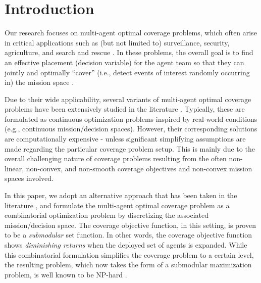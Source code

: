 \documentclass[letterpaper, 10 pt, conference]{ieeeconf}
\begin{document}
\section{Introduction}

Our research focuses on multi-agent optimal coverage problems, which often arise in critical applications such as (but not limited to) surveillance, security, agriculture, and search and rescue \cite{Rezazadeh2019,Cohen2008}. In these problems, the overall goal is to find an effective placement (decision variable) for the agent team so that they can jointly and optimally ``cover'' (i.e., detect events of interest randomly occurring in) the mission space \cite{Zhong2011}. 

Due to their wide applicability, several variants of multi-agent optimal coverage problems have been extensively studied in the literature \cite{Zhong2011,Luo2019,Welikala2019J1,Yu2022}. Typically, these are formulated as continuous optimization problems inspired by real-world conditions (e.g., continuous mission/decision spaces). However, their corresponding solutions are computationally expensive - unless significant simplifying assumptions are made regarding the particular coverage problem setup. This is mainly due to the overall challenging nature of coverage problems resulting from the often non-linear, non-convex, and non-smooth coverage objectives and non-convex mission spaces involved.   

In this paper, we adopt an alternative approach that has been taken in the literature \cite{Sun2019,Sun2020},  
and formulate the multi-agent optimal coverage problem as a combinatorial optimization problem by discretizing the associated mission/decision space. The coverage objective function, in this setting, is proven to be a \emph{submodular} set function. In other words, the coverage objective function shows \emph{diminishing returns} when the deployed set of agents is expanded. While this combinatorial formulation simplifies the coverage problem to a certain level, the resulting problem, which now takes the form of a submodular maximization problem, is well known to be NP-hard \cite{Corneuejols1977,Nemhauser1978}.    
\end{document}
